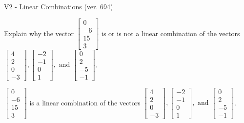 \begin{exercise}
  \begin{exerciseTitle}V2 - Linear Combinations (ver. 694)\end{exerciseTitle}
  \begin{exerciseStatement}
    Explain why the vector \(\left[\begin{array}{c}
0 \\
-6 \\
15 \\
3
\end{array}\right]\)  is or is not a linear 
	combination of the vectors \(\left[\begin{array}{c}
4 \\
2 \\
0 \\
-3
\end{array}\right] , \left[\begin{array}{c}
-2 \\
-1 \\
0 \\
1
\end{array}\right] , \text{ and } \left[\begin{array}{c}
0 \\
2 \\
-5 \\
-1
\end{array}\right]\).
	


  \end{exerciseStatement}
  \begin{exerciseAnswer}
   \(\left[\begin{array}{c}
0 \\
-6 \\
15 \\
3
\end{array}\right]\) 
  	 is  
	a linear combination of the vectors \(\left[\begin{array}{c}
4 \\
2 \\
0 \\
-3
\end{array}\right] , \left[\begin{array}{c}
-2 \\
-1 \\
0 \\
1
\end{array}\right] , \text{ and } \left[\begin{array}{c}
0 \\
2 \\
-5 \\
-1
\end{array}\right]\).

	
  


  \end{exerciseAnswer}
\end{exercise}